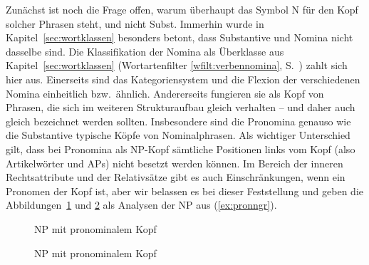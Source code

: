 
Zunächst ist noch die Frage offen, warum überhaupt das Symbol N für den Kopf solcher Phrasen steht, und nicht Subst.
Immerhin wurde in Kapitel~\ref{sec:wortklassen} besonders betont, dass Substantive und Nomina nicht dasselbe sind.
Die Klassifikation der Nomina als Überklasse aus Kapitel~\ref{sec:wortklassen} (Wortartenfilter \ref{wfilt:verbennomina}, S.~\pageref{wfilt:verbennomina}) zahlt sich hier aus.
Einerseits sind das Kategoriensystem und die Flexion der verschiedenen Nomina einheitlich bzw.\ ähnlich.
Andererseits fungieren sie als Kopf von Phrasen, die sich im weiteren Strukturaufbau gleich verhalten -- und daher auch gleich bezeichnet werden sollten.
Insbesondere sind die Pronomina genauso wie die Substantive typische Köpfe von Nominalphrasen.
Als wichtiger Unterschied gilt, dass bei Pronomina als NP-Kopf sämtliche Positionen links vom Kopf (also Artikelwörter und APs) nicht besetzt werden können.
Im Bereich der inneren Rechtsattribute und der Relativsätze gibt es auch Einschränkungen, wenn ein Pronomen der Kopf ist, aber wir belassen es bei dieser Feststellung und geben die Abbildungen~\ref{fig:pronngr1} und \ref{fig:pronngr2} als Analysen der NP aus (\ref{ex:pronngr}).

\begin{exe}
  \ex\label{ex:pronngr}
  \begin{xlist}
  \end{xlist}
\end{exe}

\begin{figure}
  \centering
  \caption{NP mit pronominalem Kopf}
  \label{fig:pronngr1}
\end{figure}

\begin{figure}
  \centering
  \caption{NP mit pronominalem Kopf}
  \label{fig:pronngr2}
\end{figure}


